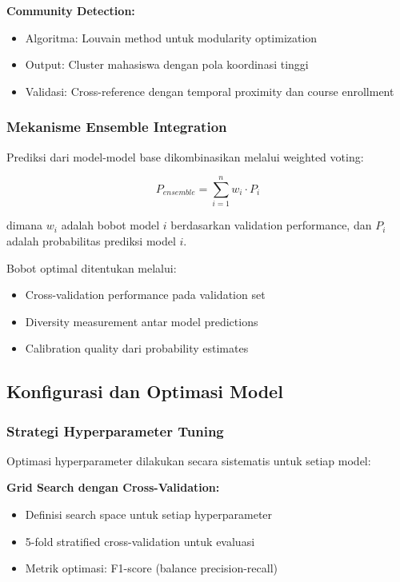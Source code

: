 \textbf{Community Detection:}
\begin{itemize}
    \item Algoritma: Louvain method untuk modularity optimization
    \item Output: Cluster mahasiswa dengan pola koordinasi tinggi
    \item Validasi: Cross-reference dengan temporal proximity dan course enrollment
\end{itemize}

\subsubsection{Mekanisme Ensemble Integration}
\label{sec:mekanismeIntegrasi}

Prediksi dari model-model base dikombinasikan melalui weighted voting:

\begin{equation}
P_{ensemble} = \sum_{i=1}^{n} w_i \cdot P_i
\end{equation}

dimana $w_i$ adalah bobot model $i$ berdasarkan validation performance, dan $P_i$ adalah probabilitas prediksi model $i$.

Bobot optimal ditentukan melalui:
\begin{itemize}
    \item Cross-validation performance pada validation set
    \item Diversity measurement antar model predictions
    \item Calibration quality dari probability estimates
\end{itemize}

\subsection{Konfigurasi dan Optimasi Model}
\label{subsec:konfigurasiOptimasi}

\subsubsection{Strategi Hyperparameter Tuning}
\label{sec:hyperparameterTuning}

Optimasi hyperparameter dilakukan secara sistematis untuk setiap model:

\textbf{Grid Search dengan Cross-Validation:}
\begin{itemize}
    \item Definisi search space untuk setiap hyperparameter
    \item 5-fold stratified cross-validation untuk evaluasi
    \item Metrik optimasi: F1-score (balance precision-recall)
\end{itemize}

